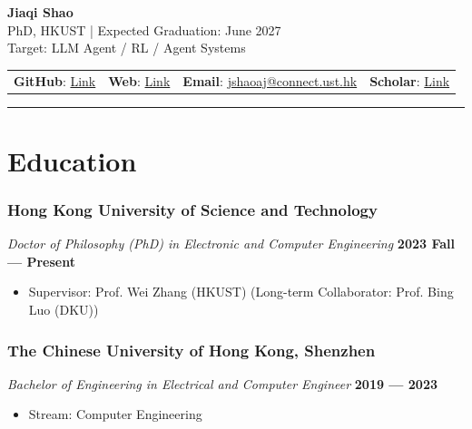 \documentclass[10pt,a4paper]{article}
\begin{document}
\begin{center}
    {\fontsize{24}{28}\selectfont\textbf{\color{namecolor}Jiaqi Shao}} \\ \vspace{0.1em}
    {\color{graytext}\fontsize{9.5}{11}\selectfont PhD, HKUST | Expected Graduation: June 2027} \\ \vspace{0.03em}
    {\color{graytext}\fontsize{9.5}{11}\selectfont Target: LLM Agent / RL / Agent Systems} \\ \vspace{0.15em}
    \begin{tabular}{c c c c}
        \textbf{GitHub}: \href{https://github.com/SHAO-Jiaqi757}{\color{linkcolor}Link} &
        \textbf{Web}: \href{https://shao-jiaqi757.github.io/}{\color{linkcolor}Link} &
        \textbf{Email}: \href{mailto:jshaoaj@connect.ust.hk}{\color{linkcolor}jshaoaj@connect.ust.hk} &
        \textbf{Scholar}: \href{https://scholar.google.com/citations?user=P8MtRXMAAAAJ\&hl=zh-CN}{\color{linkcolor}Link}
    \end{tabular}
\end{center}
\vspace{0.25em}

\noindent\color{accentcolor}\rule{\textwidth}{0.5pt}
\vspace{0.3em}

\section*{\color{sectioncolor}Education}
\subsubsection*{\color{itemcolor}Hong Kong University of Science and Technology}
\textit{\color{graytext}Doctor of Philosophy (PhD) in Electronic and Computer Engineering} \hfill \color{accentcolor}\textbf{2023 Fall --- Present}
\begin{itemize}[leftmargin=*]
    \item \small{\color{graytext}Supervisor: Prof. Wei Zhang (HKUST) (Long-term Collaborator: Prof. Bing Luo (DKU))}
\end{itemize}
\vspace{0.3em}

\subsubsection*{\color{itemcolor}The Chinese University of Hong Kong, Shenzhen}
\textit{\color{graytext}Bachelor of Engineering in Electrical and Computer Engineer} \hfill \color{accentcolor}\textbf{2019 --- 2023}
\begin{itemize}[leftmargin=*]
    \item \small{\color{graytext}Stream: Computer Engineering}
\end{itemize}
\end{document}
